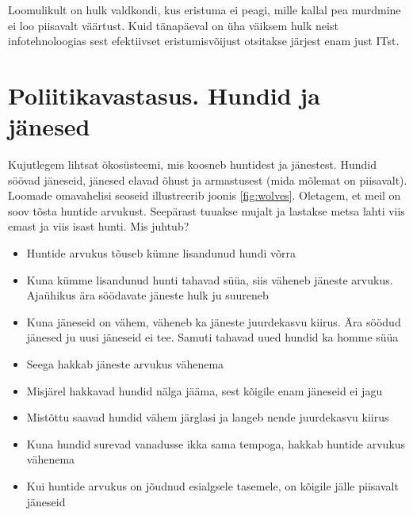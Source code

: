 \documentclass{tufte-book}
\begin{document}
Loomulikult on hulk valdkondi, kus eristuma ei peagi, mille kallal pea murdmine ei loo piisavalt väärtust. Kuid tänapäeval on üha väiksem hulk neist infotehnoloogias sest efektiivset eristumisvõijust otsitakse järjest enam just ITst.

\section{Poliitikavastasus. Hundid ja jänesed}

Kujutlegem lihtsat ökosüsteemi, mis koosneb huntidest ja jänestest. Hundid söövad jäneseid, jänesed elavad õhust ja armastusest (mida mõlemat on piisavalt). Loomade omavahelisi seoseid illustreerib joonis \ref{fig:wolves}. Oletagem, et meil on soov tõsta huntide arvukust. Seepärast tuuakse mujalt ja lastakse metsa lahti viis emast ja viis isast hunti. Mis juhtub? 
\begin{itemize}
	\item Huntide arvukus tõuseb kümne lisandunud hundi võrra
	\item Kuna kümme lisandunud hunti tahavad süüa, siis väheneb jäneste arvukus. Ajaühikus ära söödavate jäneste hulk ju suureneb
	\item Kuna jäneseid on vähem, väheneb ka jäneste juurdekasvu kiirus. Ära söödud jänesed ju uusi jäneseid ei tee. Samuti tahavad uued hundid ka homme süüa
	\item Seega hakkab jäneste arvukus vähenema
	\item Misjärel hakkavad hundid nälga jääma, sest kõigile enam jäneseid ei jagu
	\item Mistõttu saavad hundid vähem järglasi ja langeb nende juurdekasvu kiirus
	\item Kuna hundid surevad vanadusse ikka sama tempoga, hakkab huntide arvukus vähenema
	\item Kui huntide arvukus on jõudnud esialgsele tasemele, on kõigile jälle piisavalt jäneseid 
\end{itemize}
\end{document}
